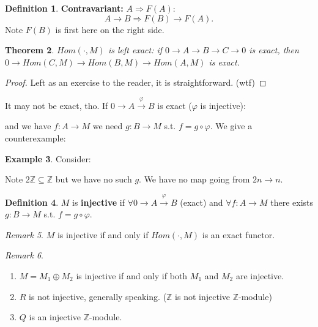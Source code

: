 \documentclass[12pt]{amsbook}
\theoremstyle{plain}
\newtheorem{theorem}{Theorem}[chapter]
\numberwithin{section}{chapter}
\numberwithin{equation}{chapter}
\theoremstyle{definition}
\newtheorem{Def}[theorem]{Definition}
\newtheorem{Ex}[theorem]{Example}
\theoremstyle{remark}
\newtheorem{rem}[theorem]{Remark}
\newcommand{\sub}{\subseteq}
\newcommand{\z}{\mathbb{Z}}
\renewcommand{\phi}{\varphi}
\begin{document}
\begin{Def}
\textbf{Contravariant: } $A \Rightarrow F(A)$:
$$
A \to B \Rightarrow F(B) \to F(A).
$$
Note $F(B)$ is first here on the right side. 
\end{Def}

\begin{theorem}
$Hom(\cdot,M)$ is left exact: 
if $0 \to A \to B \to C \to 0$ is exact, then
$0 \to Hom(C,M) \to Hom(B,M) \to Hom(A,M)$ is exact. 
\end{theorem}

\begin{proof}
Left as an exercise to the reader, it is straightforward. (wtf)
\end{proof}

It may not be exact, tho. If $0 \to A \overset{\phi}{\to}B$ is exact ($\phi$ is injective):
\begin{center}
\end{center}
and we have $f: A \to M$ we need $g:B \to M$ s.t. $f = g \circ \phi$. 
We give a counterexample:
\begin{Ex}
Consider: 
\begin{center}
\end{center}
Note $2\z \sub \z$ but we have no such $g$. We have no map going from $2n \to n$. 
\end{Ex}

\begin{Def}
$M$ is \textbf{injective} if $\forall 0 \to A \overset{\phi}{\to} B$ (exact) and $\forall f: A \to M$ there exists $g: B \to M$ s.t. $f = g \circ \phi$. 
\end{Def}

\begin{rem}
$M$ is injective if and only if $Hom(\cdot,M)$ is an exact functor. 
\end{rem}

\begin{rem}
\begin{enumerate}
\item $M = M_1 \oplus M_2$ is injective if and only if both $M_1$ and $M_2$ are injective. 
\item $R$ is not injective, generally speaking. ($\z$ is not injective $\z$-module)
\item $Q$ is an injective $\z$-module. 
\end{enumerate}
\end{rem}
\end{document}
